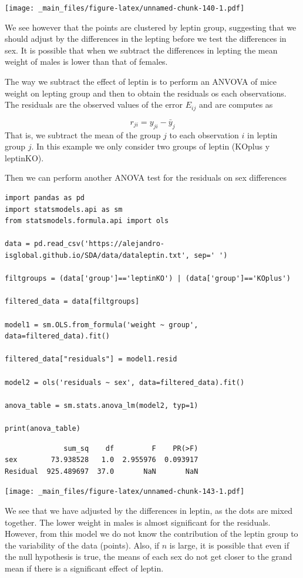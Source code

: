 \documentclass[
]{book}
\begin{document}
\texttt{[image: \_main\_files/figure-latex/unnamed-chunk-140-1.pdf]}

We see however that the points are clustered by leptin group, suggesting that we should adjust by the differences in the lepting before we test the differences in sex. It is possible that when we subtract the differences in lepting the mean weight of males is lower than that of females.

The way we subtract the effect of leptin is to perform an ANVOVA of mice weight on lepting group and then to obtain the residuals os each observations. The residuals are the observed values of the error \(E_{ij}\) and are computes as

\[r_{ji}=y_{ji}-\bar{y}_j\]
That is, we subtract the mean of the group \(j\) to each observation \(i\) in leptin group \(j\). In this example we only consider two groups of leptin (KOplus y leptinKO).

Then we can perform another ANOVA test for the residuals on sex differences

\begin{verbatim}
import pandas as pd
import statsmodels.api as sm
from statsmodels.formula.api import ols

data = pd.read_csv('https://alejandro-isglobal.github.io/SDA/data/dataleptin.txt', sep=' ')

filtgroups = (data['group']=='leptinKO') | (data['group']=='KOplus')

filtered_data = data[filtgroups]

model1 = sm.OLS.from_formula('weight ~ group', data=filtered_data).fit()

filtered_data["residuals"] = model1.resid

model2 = ols('residuals ~ sex', data=filtered_data).fit()

anova_table = sm.stats.anova_lm(model2, typ=1)

print(anova_table)
\end{verbatim}

\begin{verbatim}
              sum_sq    df         F    PR(>F)
sex        73.938528   1.0  2.955976  0.093917
Residual  925.489697  37.0       NaN       NaN
\end{verbatim}

\texttt{[image: \_main\_files/figure-latex/unnamed-chunk-143-1.pdf]}

We see that we have adjusted by the differences in leptin, as the dots are mixed together. The lower weight in males is almost significant for the residuals. However, from this model we do not know the contribution of the leptin group to the variability of the data (points). Also, if \(n\) is large, it is possible that even if the null hypothesis is true, the means of each sex do not get closer to the grand mean if there is a significant effect of leptin.
\end{document}
